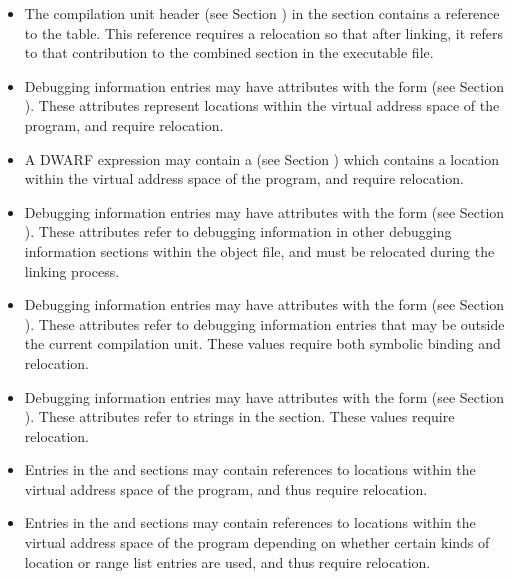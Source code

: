 \begin{itemize}
\item The compilation unit header (see Section 
) in the \dotdebuginfo{}
section contains a reference to the \dotdebugabbrev{} table. This
reference requires a relocation so that after linking, it refers to
that contribution to the combined \dotdebugabbrev{} section in the
executable file.

\item Debugging information entries may have attributes with the form
\DWFORMaddr{} (see Section ). 
These attributes represent locations
within the virtual address space of the program, and require
relocation.

\item A DWARF expression may contain a \DWOPaddr{} (see Section 
) which contains a location within 
the virtual address space of the program, and require relocation.

\item Debugging information entries may have attributes with the form
\DWFORMsecoffset{} (see Section ). 
These attributes refer to
debugging information in other debugging information sections within
the object file, and must be relocated during the linking process.

\item Debugging information entries may have attributes with the form
\DWFORMrefaddr{} (see Section ). 
These attributes refer to
debugging information entries that may be outside the current
compilation unit. These values require both symbolic binding and
relocation.

\item Debugging information entries may have attributes with the form
\DWFORMstrp{} (see Section ). 
These attributes refer to strings in
the \dotdebugstr{} section. These values require relocation.

\item Entries in the \dotdebugaddr{} and \dotdebugaranges{}
sections may contain references to locations within the virtual address
space of the program, and thus require relocation.

\item Entries in the \dotdebugloclists{} and \dotdebugrnglists{} sections may
contain references to locations within the virtual address space of the 
program depending on whether certain kinds of location or range
list entries are used, and thus require relocation.


\end{itemize}
